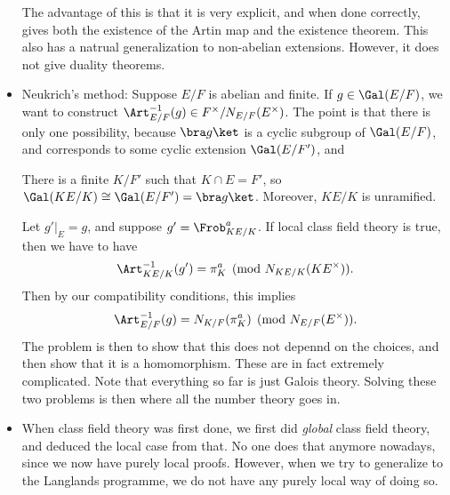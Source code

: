 \documentclass[a4paper]{article}
\begin{document}
\begin{itemize}
    The advantage of this is that it is very explicit, and when done correctly, gives both the existence of the Artin map and the existence theorem. This also has a natrual generalization to non-abelian extensions. However, it does not give duality theorems.
  \item Neukrich's method: Suppose $E/F$ is abelian and finite. If $g \in \Gal(E/F)$, we want to construct $\Art_{E/F}^{-1}(g) \in F^\times/N_{E/F}(E^\times)$. The point is that there is only one possibility, because $\bra g\ket$ is a cyclic subgroup of $\Gal(E/F)$, and corresponds to some cyclic extension $\Gal(E/F')$, and
    \begin{lemma}
      There is a finite $K/F'$ such that $K \cap E = F'$, so $\Gal(KE/K) \cong \Gal(E/F') = \bra g\ket$. Moreover, $KE/K$ is unramified.
    \end{lemma}
    Let $g'|_E = g$, and suppose $g' = \Frob_{KE/K}^a$. If local class field theory is true, then we have to have
    \[
      \Art_{KE/K}^{-1}(g') = \pi_K^a\pmod{N_{KE/K}(KE^\times)}.
    \]
    Then by our compatibility conditions, this implies
    \[
      \Art_{E/F}^{-1}(g) = N_{K/F}(\pi_K^a) \pmod {N_{E/F}(E^\times)}.
    \]
    The problem is then to show that this does not depennd on the choices, and then show that it is a homomorphism. These are in fact extremely complicated. Note that everything so far is just Galois theory. Solving these two problems is then where all the number theory goes in.
  \item When class field theory was first done, we first did \emph{global} class field theory, and deduced the local case from that. No one does that anymore nowadays, since we now have purely local proofs. However, when we try to generalize to the Langlands programme, we do not have any purely local way of doing so.
\end{itemize}
\end{document}
